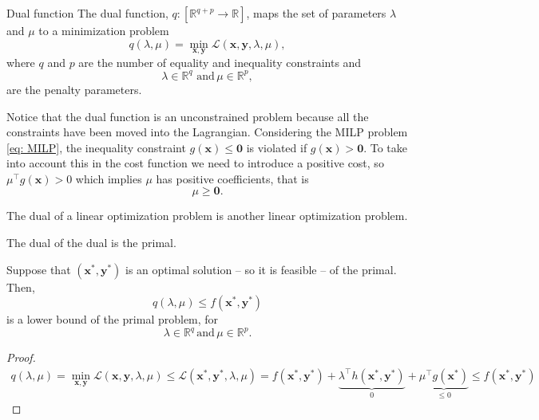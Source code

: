 \begin{definition}{Dual function}{}
The dual function, $q: \left[\mathbb{R}^{q+p}\rightarrow\mathbb{R}\right]$, maps the set of parameters $\lambda$ and $\mu$ to a minimization problem
\begin{equation}
    q(\lambda, \mu) = \min_{\mathbf{x}, \mathbf{y}}\mathcal{L}(\mathbf{x},\mathbf{y}, \lambda, \mu),
\end{equation}
where $q$ and $p$ are the number of equality and inequality constraints and
\begin{equation}
    \lambda\in\mathbb{R}^{q}\,\, \textrm{and}\, \mu\in\mathbb{R}^{p},
\end{equation}
are the penalty parameters.
\end{definition}
Notice that the dual function is an unconstrained problem because all the constraints have been moved into the Lagrangian.
Considering the MILP problem \eqref{eq: MILP}, the inequality constraint $g(\mathbf{x})\leq \mathbf{0}$ is violated if $g(\mathbf{x})>\mathbf{0}$. To take into account this in the cost function we need to introduce a positive cost, so $\mu^{\intercal}g(\mathbf{x})>0$ which implies $\mu$ has positive coefficients, that is
\begin{equation}
    \mu \geq \mathbf{0}.
\end{equation}
\begin{theorem}{}{}
The dual of a linear optimization problem is another linear optimization problem.
\end{theorem}
\begin{theorem}{}{}
The dual of the dual is the primal.
\end{theorem}
\begin{theorem}{}{}
Suppose that $(\mathbf{x}^{*}, \mathbf{y}^{*})$ is an optimal solution -- so it is feasible -- of the primal. Then,
\begin{equation}
    q(\lambda, \mu) \leq f(\mathbf{x}^{*},\mathbf{y}^{*})
\end{equation}
is a lower bound of the primal problem, for
\begin{equation}
    \lambda\in\mathbb{R}^{q}\, \textrm{and}\, \mu\in\mathbb{R}^{p}.
\end{equation}
\end{theorem}
\begin{proof}
\begin{align}
    q(\lambda, \mu) = \min_{\mathbf{x}, \mathbf{y}} \mathcal{L}(\mathbf{x}, \mathbf{y}, \lambda, \mu) \leq \mathcal{L}(\mathbf{x}^{*}, \mathbf{y}^{*}, \lambda, \mu) = f(\mathbf{x}^{*}, \mathbf{y}^{*}) + \underbrace{\lambda^{\intercal}h(\mathbf{x}^{*}, \mathbf{y}^{*})}_{0} + \underbrace{\mu^{\intercal}g(\mathbf{x}^{*})}_{\leq 0} \leq f(\mathbf{x}^{*}, \mathbf{y}^{*})
\end{align}
\end{proof}
